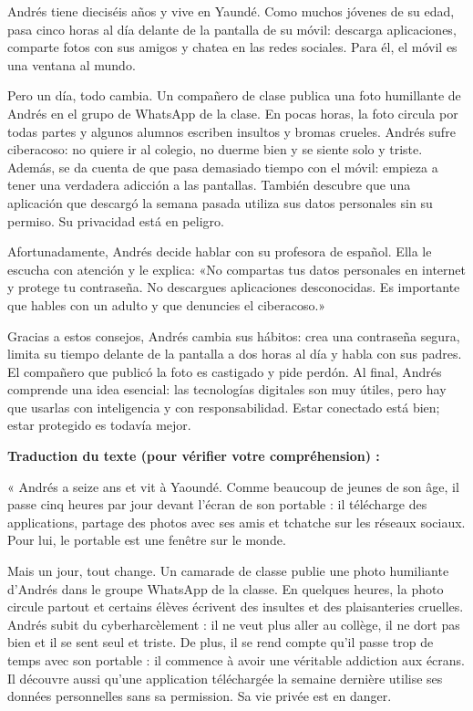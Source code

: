 \documentclass[11pt]{article}
\begin{document}
\begin{textebox}
Andrés tiene dieciséis años y vive en Yaundé. Como muchos jóvenes de su edad, pasa cinco horas al día delante de la pantalla de su móvil: descarga aplicaciones, comparte fotos con sus amigos y chatea en las redes sociales. Para él, el móvil es una ventana al mundo.

Pero un día, todo cambia. Un compañero de clase publica una foto humillante de Andrés en el grupo de WhatsApp de la clase. En pocas horas, la foto circula por todas partes y algunos alumnos escriben insultos y bromas crueles. Andrés sufre ciberacoso: no quiere ir al colegio, no duerme bien y se siente solo y triste. Además, se da cuenta de que pasa demasiado tiempo con el móvil: empieza a tener una verdadera adicción a las pantallas. También descubre que una aplicación que descargó la semana pasada utiliza sus datos personales sin su permiso. Su privacidad está en peligro.

Afortunadamente, Andrés decide hablar con su profesora de español. Ella le escucha con atención y le explica: «No compartas tus datos personales en internet y protege tu contraseña. No descargues aplicaciones desconocidas. Es importante que hables con un adulto y que denuncies el ciberacoso.»

Gracias a estos consejos, Andrés cambia sus hábitos: crea una contraseña segura, limita su tiempo delante de la pantalla a dos horas al día y habla con sus padres. El compañero que publicó la foto es castigado y pide perdón. Al final, Andrés comprende una idea esencial: las tecnologías digitales son muy útiles, pero hay que usarlas con inteligencia y con responsabilidad. Estar conectado está bien; estar protegido es todavía mejor.
\end{textebox}

\textbf{Traduction du texte (pour vérifier votre compréhension) :}

« Andrés a seize ans et vit à Yaoundé. Comme beaucoup de jeunes de son âge, il passe cinq heures par jour devant l'écran de son portable : il télécharge des applications, partage des photos avec ses amis et tchatche sur les réseaux sociaux. Pour lui, le portable est une fenêtre sur le monde.

Mais un jour, tout change. Un camarade de classe publie une photo humiliante d'Andrés dans le groupe WhatsApp de la classe. En quelques heures, la photo circule partout et certains élèves écrivent des insultes et des plaisanteries cruelles. Andrés subit du cyberharcèlement : il ne veut plus aller au collège, il ne dort pas bien et il se sent seul et triste. De plus, il se rend compte qu'il passe trop de temps avec son portable : il commence à avoir une véritable addiction aux écrans. Il découvre aussi qu'une application téléchargée la semaine dernière utilise ses données personnelles sans sa permission. Sa vie privée est en danger.
\end{document}
